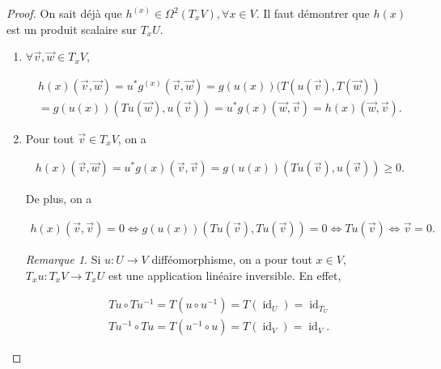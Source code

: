 \documentclass[french]{article}
\theoremstyle{definition}
\theoremstyle{remark}
\newtheorem*{remark}{Remarque}
\begin{document}
\begin{proof}
  On sait déjà que \(h ^{(x)} \in \Omega ^2(T_x V), \forall x \in V\). Il faut démontrer que \(h(x)\) est un produit scalaire sur \(T_x U\).

  \begin{enumerate}
    \item \(\forall \overrightarrow{v}, \overrightarrow{w} \in T_x V\),

    \begin{gather*}
      h(x)(\overrightarrow{v}, \overrightarrow{w}) = u ^{*}g ^{(x)}(\overrightarrow{v}, \overrightarrow{w}) = g(u(x))(T(u (\overrightarrow{v}), T(\overrightarrow{w})) \\
      = g(u(x))(T u(\overrightarrow{w}),u(\overrightarrow{v})) = u ^{*}g(x)(\overrightarrow{w}, \overrightarrow{v})=h(x)(\overrightarrow{w}, \overrightarrow{v}).
    \end{gather*}

    \item Pour tout \(\overrightarrow{v} \in T_x V\), on a

    \begin{gather*}
      h(x)(\overrightarrow{v}, \overrightarrow{w}) = u ^{*}g(x)(\overrightarrow{v}, \overrightarrow{v}) = g(u(x))(T u(\overrightarrow{v}), u(\overrightarrow{v})) \geq 0.
    \end{gather*}

    De plus, on a

    \begin{gather*}
      h(x)(\overrightarrow{v}, \overrightarrow{v})=0 \iff g(u(x))(T u (\overrightarrow{v}), T u (\overrightarrow{v})) = 0 \iff T u(\overrightarrow{v}) \iff \overrightarrow{v} = 0.
    \end{gather*}

    \begin{remark}
      Si \(u : U \longrightarrow V\) difféomorphisme, on a pour tout \(x \in V\), \(T_x u : T_x V \longrightarrow T_x U\) est une application linéaire inversible. En effet,

      \begin{gather*}
        T u \circ T u ^{-1} = T (u \circ u ^{-1}) = T (\operatorname{id}_U) = \operatorname{id}_{T_U} \\
        T u ^{-1} \circ T u = T (u ^{-1} \circ u) = T(\operatorname{id}_V) = \operatorname{id}_V.
      \end{gather*}
    \end{remark}
  \end{enumerate}
\end{proof}
\end{document}
